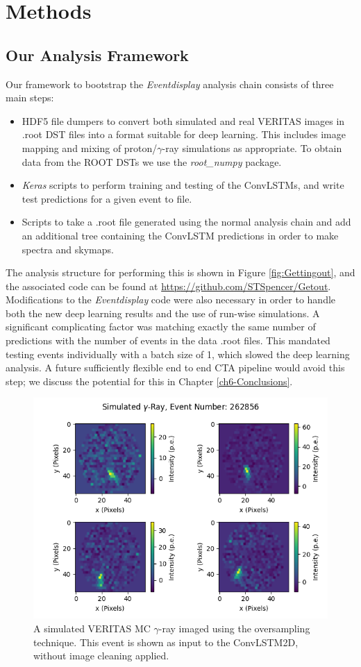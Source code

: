 \section{Methods}
\subsection{Our Analysis Framework}
Our framework to bootstrap the \textit{Eventdisplay} analysis chain consists of three main steps:
\begin{itemize}
    \item HDF5 file dumpers to convert both simulated and real VERITAS images in .root DST files into a format suitable for deep learning. This includes image mapping and mixing of proton/$\gamma$-ray simulations as appropriate. To obtain data from the ROOT DSTs we use the \textit{root\_numpy} \cite{rootnumpy} package.
    \item \textit{Keras} scripts to perform training and testing of the ConvLSTMs, and write test predictions for a given event to file.
    \item Scripts to take a .root file generated using the normal analysis chain and add an additional tree containing the ConvLSTM predictions in order to make spectra and skymaps.
\end{itemize}
The analysis structure for performing this is shown in Figure \ref{fig:Gettingout}, and the associated code can be found at \url{https://github.com/STSpencer/Getout}. Modifications to the \textit{Eventdisplay} code were also necessary in order to handle both the new deep learning results and the use of run-wise simulations. A significant complicating factor was matching exactly the same number of predictions with the number of events in the data .root files. This mandated testing events individually with a batch size of 1, which slowed the deep learning analysis. A future sufficiently flexible end to end CTA pipeline would avoid this step; we discuss the potential for this in Chapter \ref{ch6-Conclusions}.
\begin{figure}[h] 
        \centering \includegraphics[width=0.8\columnwidth]{figures/sim_272_oversampling.png}

        \caption{
                \label{fig:sim} A simulated VERITAS MC $\gamma$-ray imaged using the oversampling technique. This event is shown as input to the ConvLSTM2D, without image cleaning applied.
        }
\end{figure}

